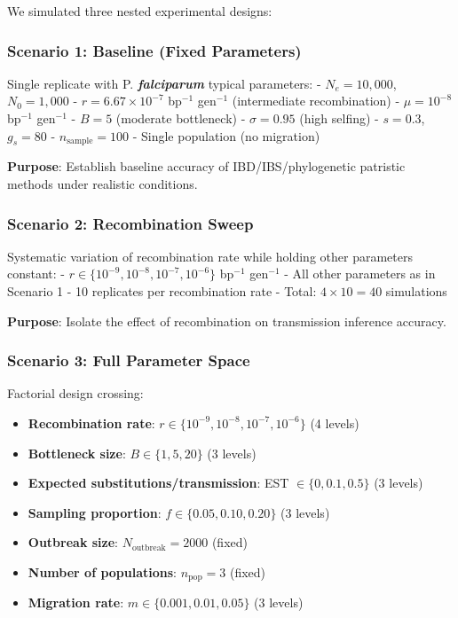 \documentclass[
  11pt,
]{article}
\providecommand{\tightlist}{%
  \setlength{\itemsep}{0pt}\setlength{\parskip}{0pt}}
\begin{document}
We simulated three nested experimental designs:

\subsubsection{Scenario 1: Baseline (Fixed
Parameters)}\label{scenario-1-baseline-fixed-parameters}

Single replicate with P. \textbf{\emph{falciparum}} typical parameters:
- \(N_e = 10,000\), \(N_0 = 1,000\) - \(r = 6.67 \times 10^{-7}\)
bp\(^{-1}\) gen\(^{-1}\) (intermediate recombination) -
\(\mu = 10^{-8}\) bp\(^{-1}\) gen\(^{-1}\) - \(B = 5\) (moderate
bottleneck) - \(\sigma = 0.95\) (high selfing) - \(s = 0.3\),
\(g_s = 80\) - \(n_{\text{sample}} = 100\) - Single population (no
migration)

\textbf{Purpose}: Establish baseline accuracy of IBD/IBS/phylogenetic
patristic methods under realistic conditions.

\subsubsection{Scenario 2: Recombination
Sweep}\label{scenario-2-recombination-sweep}

Systematic variation of recombination rate while holding other
parameters constant: - \(r \in \{10^{-9}, 10^{-8}, 10^{-7}, 10^{-6}\}\)
bp\(^{-1}\) gen\(^{-1}\) - All other parameters as in Scenario 1 - 10
replicates per recombination rate - Total: \(4 \times 10 = 40\)
simulations

\textbf{Purpose}: Isolate the effect of recombination on transmission
inference accuracy.

\subsubsection{Scenario 3: Full Parameter
Space}\label{scenario-3-full-parameter-space}

Factorial design crossing:

\begin{itemize}
\tightlist
\item
  \textbf{Recombination rate}:
  \(r \in \{10^{-9}, 10^{-8}, 10^{-7}, 10^{-6}\}\) (4 levels)
\item
  \textbf{Bottleneck size}: \(B \in \{1, 5, 20\}\) (3 levels)
\item
  \textbf{Expected substitutions/transmission}: EST
  \(\in \{0, 0.1, 0.5\}\) (3 levels)
\item
  \textbf{Sampling proportion}: \(f \in \{0.05, 0.10, 0.20\}\) (3
  levels)
\item
  \textbf{Outbreak size}: \(N_{\text{outbreak}} = 2000\) (fixed)
\item
  \textbf{Number of populations}: \(n_{\text{pop}} = 3\) (fixed)
\item
  \textbf{Migration rate}: \(m \in \{0.001, 0.01, 0.05\}\) (3 levels)
\end{itemize}
\end{document}
